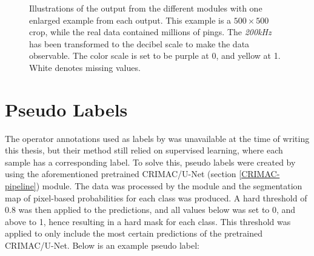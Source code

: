        
        \begin{figure}[H]
            \centering
            
            \caption[Module outputs illustration]{Illustrations of the output from the different modules with one enlarged example from each output. This example is a $500\times500$ crop, while the real data contained millions of pings. The \textit{200kHz} has been transformed to the decibel scale to make the data observable. The color scale is set to be purple at 0, and yellow at 1. White denotes missing values.}
          	\medskip 
            \label{Module_outputs_illustration_fig}
        \end{figure}

    \section{Pseudo Labels} \label{Pseudo label}
        The operator annotations used as labels by \citeauthor{brautaset2020acoustic}\cite{brautaset2020acoustic} was unavailable at the time of writing this thesis, but their method still relied on supervised learning, where each sample has a corresponding label. To solve this, pseudo labels were created by using the aforementioned pretrained CRIMAC/U-Net (section \ref{CRIMAC-pipeline}) module. The data was processed by the module and the segmentation map of pixel-based probabilities for each class was produced. A hard threshold of 0.8 was then applied to the predictions, and all values below was set to 0, and above to 1, hence resulting in a hard mask for each class. This threshold was applied to only include the most certain predictions of the pretrained CRIMAC/U-Net. Below is an example pseudo label:
        

